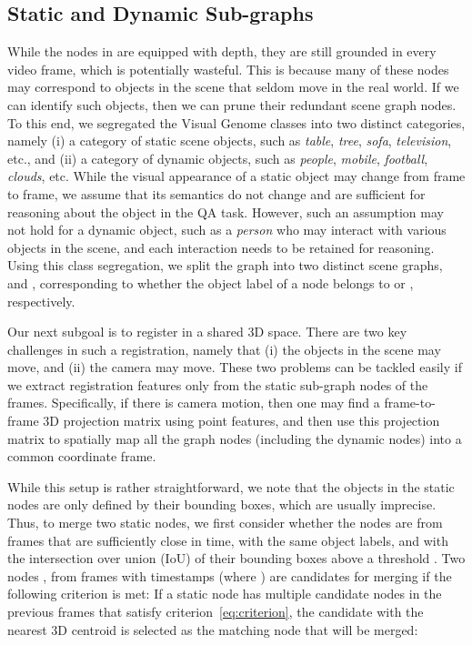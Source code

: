 \documentclass[letterpaper]{article} \usepackage{aaai22}  \usepackage{times}  \usepackage{helvet}  \usepackage{courier}  \usepackage[hyphens]{url}  \usepackage{graphicx} \urlstyle{rm} \def\UrlFont{\rm}  \usepackage{natbib}  \usepackage{caption} \DeclareCaptionStyle{ruled}{labelfont=normalfont,labelsep=colon,strut=off} \frenchspacing  \setlength{\pdfpagewidth}{8.5in}  \setlength{\pdfpageheight}{11in}  \usepackage{algorithm}
\begin{document}
\subsection{Static and Dynamic Sub-graphs}
While the nodes in  are equipped with depth, they are still grounded in every video frame, which is potentially wasteful. This is because many of these nodes may correspond to objects in the scene that seldom move in the real world. If we can identify such objects, then we can prune their redundant scene graph nodes. To this end, we segregated the Visual Genome classes into two distinct categories,  namely (i) a category  of static scene objects, such as \emph{table}, \emph{tree}, \emph{sofa}, \emph{television}, etc., and (ii) a category  of dynamic objects, such as \emph{people}, \emph{mobile}, \emph{football}, \emph{clouds}, etc. While the visual appearance of a static object may change from frame to frame, we assume that its semantics do not change and are sufficient for reasoning about the object in the QA task. However, such an assumption may not hold for a dynamic object, such as a \emph{person} who may interact with various objects in the scene, and each interaction needs to be retained for reasoning. Using this class segregation, we split the graph  into two distinct scene graphs,  and , corresponding to whether the object label  of a node  belongs to  or , respectively. 

Our next subgoal is to register  in a shared 3D space. There are two key challenges in such a registration, namely that (i) the objects in the scene may move, and (ii) the camera may move. These two problems can be tackled easily if we extract registration features only from the static sub-graph nodes of the frames. Specifically, if there is camera motion, then one may find a frame-to-frame 3D projection matrix using point features, and then use this projection matrix to spatially map all the graph nodes (including the dynamic nodes) into a common coordinate frame. 

While this setup is rather straightforward, we note that the objects in the static nodes are only defined by their bounding boxes, which are usually imprecise. Thus, to merge two static nodes, we first consider whether the nodes are from frames that are sufficiently close in time, with the same object labels, and with the intersection over union (IoU) of their bounding boxes above a threshold . Two nodes  , from frames with timestamps  (where ) are candidates for merging if the following criterion  is met: 
If a static node  has multiple candidate nodes in the previous  frames that satisfy criterion~\eqref{eq:criterion}, the candidate with the nearest 3D centroid is selected as the matching node that will be merged:
\end{document}
